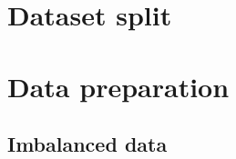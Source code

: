 \section{Dataset split} \label{sec:datasetsplit}



	
\section{Data preparation}
	\subsection{Imbalanced data}



